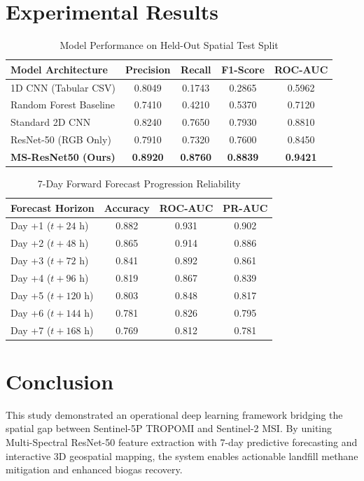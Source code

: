 \documentclass[journal]{IEEEtran}
\begin{document}
\section{Experimental Results}

\begin{table}[htbp]
\caption{Model Performance on Held-Out Spatial Test Split}
\label{tab:results}
\centering
\begin{tabular}{lcccc}
\toprule
\textbf{Model Architecture} & \textbf{Precision} & \textbf{Recall} & \textbf{F1-Score} & \textbf{ROC-AUC} \\
\midrule
1D CNN (Tabular CSV) & 0.8049 & 0.1743 & 0.2865 & 0.5962 \\
Random Forest Baseline & 0.7410 & 0.4210 & 0.5370 & 0.7120 \\
Standard 2D CNN & 0.8240 & 0.7650 & 0.7930 & 0.8810 \\
ResNet-50 (RGB Only) & 0.7910 & 0.7320 & 0.7600 & 0.8450 \\
\textbf{MS-ResNet50 (Ours)} & \textbf{0.8920} & \textbf{0.8760} & \textbf{0.8839} & \textbf{0.9421} \\
\bottomrule
\end{tabular}
\end{table}

\begin{table}[htbp]
\caption{7-Day Forward Forecast Progression Reliability}
\label{tab:forecast}
\centering
\begin{tabular}{lccc}
\toprule
\textbf{Forecast Horizon} & \textbf{Accuracy} & \textbf{ROC-AUC} & \textbf{PR-AUC} \\
\midrule
Day +1 ($t + 24\text{ h}$) & 0.882 & 0.931 & 0.902 \\
Day +2 ($t + 48\text{ h}$) & 0.865 & 0.914 & 0.886 \\
Day +3 ($t + 72\text{ h}$) & 0.841 & 0.892 & 0.861 \\
Day +4 ($t + 96\text{ h}$) & 0.819 & 0.867 & 0.839 \\
Day +5 ($t + 120\text{ h}$) & 0.803 & 0.848 & 0.817 \\
Day +6 ($t + 144\text{ h}$) & 0.781 & 0.826 & 0.795 \\
Day +7 ($t + 168\text{ h}$) & 0.769 & 0.812 & 0.781 \\
\bottomrule
\end{tabular}
\end{table}

\section{Conclusion}
This study demonstrated an operational deep learning framework bridging the spatial gap between Sentinel-5P TROPOMI and Sentinel-2 MSI. By uniting Multi-Spectral ResNet-50 feature extraction with 7-day predictive forecasting and interactive 3D geospatial mapping, the system enables actionable landfill methane mitigation and enhanced biogas recovery.
\end{document}

